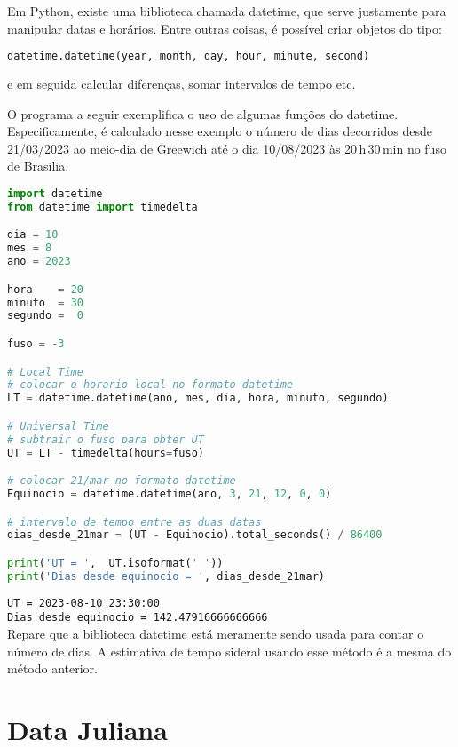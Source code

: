 Em Python, existe uma biblioteca chamada datetime, que serve justamente para manipular datas e horários. Entre outras coisas, é possível criar objetos do tipo:

\begin{lstlisting}[language=Python]
datetime.datetime(year, month, day, hour, minute, second)
\end{lstlisting}

\noindent e em seguida calcular diferenças, somar intervalos de tempo etc.

O programa a seguir exemplifica o uso de algumas funções do datetime. Especificamente, é calculado nesse exemplo o número de dias decorridos desde 21/03/2023 ao meio-dia de Greewich até o dia 10/08/2023 às 20\,h\,30\,min no fuso de Brasília.

\begin{lstlisting}[language=Python]
import datetime
from datetime import timedelta

dia = 10
mes = 8
ano = 2023

hora    = 20 
minuto  = 30
segundo =  0

fuso = -3

# Local Time
# colocar o horario local no formato datetime
LT = datetime.datetime(ano, mes, dia, hora, minuto, segundo)

# Universal Time
# subtrair o fuso para obter UT
UT = LT - timedelta(hours=fuso)

# colocar 21/mar no formato datetime
Equinocio = datetime.datetime(ano, 3, 21, 12, 0, 0)

# intervalo de tempo entre as duas datas
dias_desde_21mar = (UT - Equinocio).total_seconds() / 86400

print('UT = ',  UT.isoformat(' '))
print('Dias desde equinocio = ', dias_desde_21mar)

\end{lstlisting}
\noindent\texttt{UT =  2023-08-10 23:30:00}\\
\noindent\texttt{Dias desde equinocio =  142.47916666666666}\\

Repare que a biblioteca datetime está meramente sendo usada para contar o número de dias. A estimativa de tempo sideral usando esse método é a mesma do método anterior.

\section{Data Juliana}
\label{sec:ts3}

